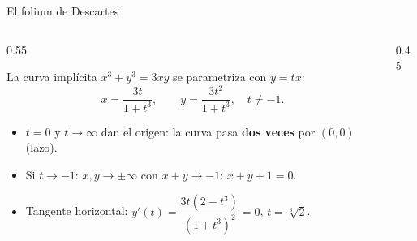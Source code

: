 \documentclass[10pt,aspectratio=169]{beamer}
\begin{document}
\begin{frame}{El folium de Descartes}
  \begin{columns}
    \begin{column}{0.55\textwidth}
      \begin{ejemplo}[4]
        La curva implícita $x^3+y^3=3xy$ se parametriza con $y=tx$:
        \[ x=\frac{3t}{1+t^3},\qquad y=\frac{3t^2}{1+t^3},\quad t\neq-1. \]
        \begin{itemize}
          \item $t=0$ y $t\to\infty$ dan el origen: la curva pasa \textbf{dos veces} por $(0,0)$ (lazo).
          \item Si $t\to-1$: $x,y\to\pm\infty$ con $x+y\to-1$:  $x+y+1=0$.
          \item Tangente horizontal: $y'(t)=\dfrac{3t(2-t^3)}{(1+t^3)^2}=0$, $t=\sqrt[3]2$.
        \end{itemize}
      \end{ejemplo}
    \end{column}
    \begin{column}{0.45\textwidth}
      \centering
    \end{column}
  \end{columns}
\end{frame}
\end{document}
